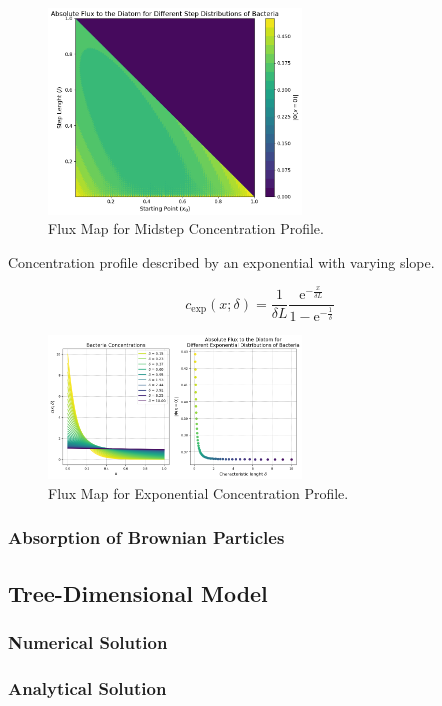 \begin{figure}[H]
    \centering
    \includegraphics[width=0.6\textwidth]{Figures/FluxMap_midstep.png}
    \caption{Flux Map for Midstep Concentration Profile.}
    \label{fig:FluxMap_midstep}
\end{figure}

Concentration profile described by an exponential with varying slope.

\begin{equation}
    c_{\text{exp}}(x; \delta) =
    \frac{1}{\delta L}
    \frac{\mathrm{e}^{-\frac{x}{\delta L}}}{1 - \mathrm{e}^{-\frac{1}{\delta}}}
\end{equation}

\begin{figure}[H]
    \centering
    \includegraphics[width=0.6\textwidth]{Figures/FluxMap_exp.png}
    \caption{Flux Map for Exponential Concentration Profile.}
    \label{fig:FluxMap_exp}
\end{figure}

\subsubsection{Absorption of Brownian Particles}

\subsection{Tree-Dimensional Model}

\subsubsection{Numerical Solution}

\subsubsection{Analytical Solution}